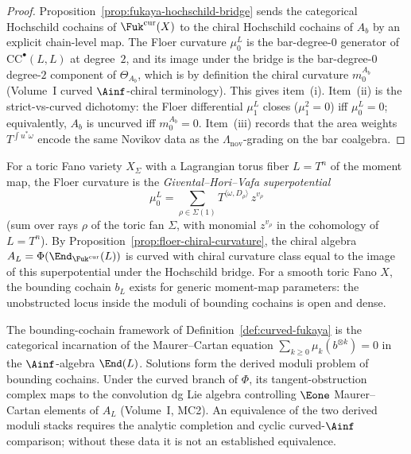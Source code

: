 \begin{proof}
Proposition~\ref{prop:fukaya-hochschild-bridge} sends the categorical
Hochschild cochains of $\Fuk^{\mathrm{cur}}(X)$ to the chiral
Hochschild cochains of $A_b$ by an explicit chain-level map. The
Floer curvature $\mu_0^L$ is the bar-degree-$0$ generator of
$\mathrm{CC}^\bullet(L,L)$ at degree~$2$, and its image under the
bridge is the bar-degree-$0$ degree-$2$ component of
$\Theta_{A_b}$, which is by definition the chiral curvature
$m_0^{A_b}$ (Volume~I curved $\Ainf$-chiral terminology). This
gives item~(i). Item~(ii) is the strict-vs-curved dichotomy: the
Floer differential $\mu_1^L$ closes ($\mu_1^2 = 0$) iff
$\mu_0^L = 0$; equivalently, $A_b$ is uncurved iff
$m_0^{A_b} = 0$. Item~(iii) records that the area weights
$T^{\int u^*\omega}$ encode the same Novikov data as the
$\Lambda_{\mathrm{nov}}$-grading on the bar coalgebra.
\end{proof}

\begin{example}[Toric Fukaya: curvature = superpotential]
\label{ex:toric-fukaya-curvature}
For a toric Fano variety $X_\Sigma$ with a Lagrangian torus fiber
$L = T^n$ of the moment map, the Floer curvature is the
\emph{Givental--Hori--Vafa superpotential}
\[
 \mu_0^{L} = \sum_{\rho \in \Sigma(1)} T^{\langle \omega, D_\rho \rangle}\,
 z^{v_\rho}
\]
(sum over rays $\rho$ of the toric fan $\Sigma$, with monomial
$z^{v_\rho}$ in the cohomology of $L = T^n$). By
Proposition~\ref{prop:floer-chiral-curvature}, the chiral
algebra $A_L = \Phi(\End_{\Fuk^{\mathrm{cur}}}(L))$ is curved with
chiral curvature class equal to the image of this
superpotential under the Hochschild bridge. For a smooth toric
Fano $X$, the bounding cochain $b_L$ exists for generic
moment-map parameters: the unobstructed locus inside the moduli
of bounding cochains is open and dense.
\end{example}

\begin{remark}
\label{rem:fooo-deformation}
The bounding-cochain framework of
Definition~\ref{def:curved-fukaya} is the categorical incarnation
of the Maurer--Cartan equation
$\sum_{k \geq 0} \mu_k(b^{\otimes k}) = 0$ in the
$\Ainf$-algebra $\End(L)$. Solutions form the derived moduli
problem of bounding cochains. Under the curved branch of $\Phi$, its
tangent-obstruction complex maps to the convolution dg Lie algebra
controlling $\Eone$ Maurer--Cartan elements of $A_L$ (Volume~I,
MC2). An equivalence of the two derived moduli stacks requires the
analytic completion and cyclic curved-$\Ainf$ comparison; without these
data it is not an established equivalence.
\end{remark}


